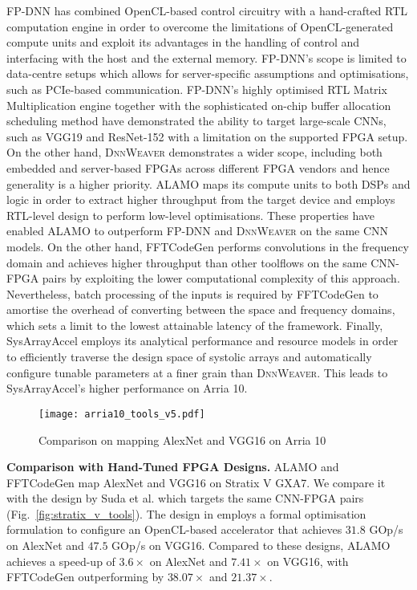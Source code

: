 \documentclass[format=acmsmall, review=false, screen=true]{acmart}
\begin{document}
FP-DNN has combined OpenCL-based control circuitry with a hand-crafted RTL computation engine in order to overcome the limitations of OpenCL-generated compute units and exploit its advantages in the handling of control and interfacing with the host and the external memory. FP-DNN's scope is limited to data-centre setups which allows for server-specific assumptions and optimisations, such as PCIe-based communication. FP-DNN's highly optimised RTL Matrix Multiplication engine together with the sophisticated on-chip buffer allocation scheduling method have demonstrated the ability to target large-scale CNNs, such as VGG19 and ResNet-152 with a limitation on the supported FPGA setup. On the other hand, \textsc{DnnWeaver} demonstrates a wider scope, including both embedded and server-based FPGAs across different FPGA vendors and hence generality is a higher priority. {\color{black}ALAMO maps its compute units to both DSPs and logic in order to extract higher throughput from the target device and employs RTL-level design to perform low-level optimisations. These properties have enabled ALAMO to outperform FP-DNN and \textsc{DnnWeaver} on the same CNN models. On the other hand, FFTCodeGen performs convolutions in the frequency domain and achieves higher throughput than other toolflows on the same CNN-FPGA pairs by exploiting the lower computational complexity of this approach. Nevertheless, batch processing of the inputs is required by FFTCodeGen to amortise the overhead of converting between the space and frequency domains, which sets a limit to the lowest attainable latency of the framework.} Finally, SysArrayAccel employs its analytical performance and resource models in order to efficiently traverse the design space of systolic arrays and automatically configure tunable parameters at a finer grain than \textsc{DnnWeaver}. This leads to SysArrayAccel's higher performance on Arria 10. 




\begin{figure*}[t]
    \centering
    \texttt{[image: arria10\_tools\_v5.pdf]}
    \vspace{-0.4cm}
    \caption{Comparison on mapping AlexNet and VGG16 on Arria 10}
	\label{fig:arria10_tools}
    \vspace{-0.5cm}
\end{figure*}

\textbf{Comparison with Hand-Tuned FPGA Designs.}
ALAMO {\color{black}and FFTCodeGen} map AlexNet and VGG16 on Stratix V GXA7. We compare it with the design by Suda et al. \cite{Suda_2016} which targets the same CNN-FPGA pairs \mbox{(Fig. \ref{fig:stratix_v_tools})}. The design in \cite{Suda_2016} employs a formal optimisation formulation to configure an OpenCL-based accelerator that achieves $31.8$ GOp/s on AlexNet and $47.5$ GOp/s on VGG16. Compared to these designs, ALAMO achieves a speed-up of $3.6 \times$ on AlexNet and $7.41\times$ on VGG16, {\color{black} with FFTCodeGen outperforming by $38.07\times$ and $21.37\times$}. 
\end{document}
